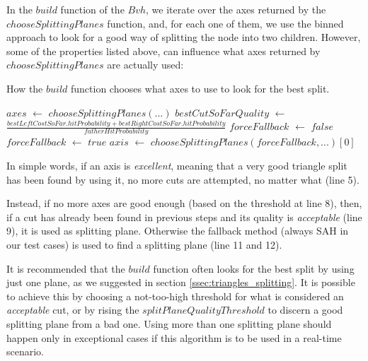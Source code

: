 \documentclass{PoliMi_MasterThesis}
\newcommand*\Let[2]{\State #1 $\gets$ #2}
\begin{document}
In the $build$ function of the $Bvh$, we iterate over the axes returned by the $chooseSplittingPlanes$ function, and, for each one of them, we use the binned approach to look for a good way of splitting the node into two children. However, some of the properties listed above, can influence what axes returned by $chooseSplittingPlanes$ are actually used:

\begin{algorithm}[H]
	\caption{How the $build$ function chooses what axes to use to look for the best split.}
	\begin{algorithmic}[1]
		\Let{$axes$}{$chooseSplittingPlanes(...)$}
			\Let{$bestCutSoFarQuality$}{$\frac{bestLeftCostSoFar.hitProbability + bestRightCostSoFar.hitProbability}{fatherHitProbability}$}
				\EndIf
				\Let{$forceFallback$}{$false$}
					\EndIf
				\EndIf
				\Let{$forceFallback$}{$true$}
				\Let{$axis$}{$chooseSplittingPlanes(forceFallback, ...)[0]$}
		\EndFor
	\end{algorithmic}
\end{algorithm} 

In simple words, if an axis is \textit{excellent}, meaning that a very good triangle split has been found by using it, no more cuts are attempted, no matter what (line 5).

Instead, if no more axes are good enough (based on the threshold at line 8), then, if a cut has already been found in previous steps and its quality is \textit{acceptable} (line 9), it is used as splitting plane. Otherwise the fallback method (always SAH in our test cases) is used to find a splitting plane (line 11 and 12).

It is recommended that the $build$ function often looks for the best split by using just one plane, as we suggested in section \ref{ssec:triangles_splitting}. It is possible to achieve this by choosing a not-too-high threshold for what is considered an \textit{acceptable} cut, or by rising the $splitPlaneQualityThreshold$ to discern a good splitting plane from a bad one. Using more than one splitting plane should happen only in exceptional cases if this algorithm is to be used in a real-time scenario.
\end{document}
